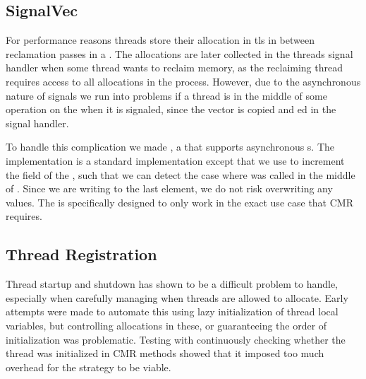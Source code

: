\subsection{SignalVec\label{sec:impl-signalvec}}

For performance reasons threads store their allocation in \gls{tls} in between reclamation passes
in a .  The allocations are later collected in the threads signal handler when some
thread wants to reclaim memory, as the reclaiming thread requires access to all allocations in the
process. However, due to the asynchronous nature of signals we run into problems if a thread is in
the middle of some operation on the  when it is signaled, since the vector is copied and
ed in the signal handler.

To handle this complication we made , a  that supports asynchronous
s. The implementation is a standard  implementation except that we use
 to increment the  field of the , such that we can detect
the case where  was called in the middle of . Since we are writing to the
last element, we do not risk overwriting any values. The  is specifically designed
to only work in the exact use case that CMR requires.


\subsection{Thread Registration\label{sec:impl-thread-registration}}

Thread startup and shutdown has shown to be a difficult problem to handle, especially when
carefully managing when threads are allowed to allocate. Early attempts were made to automate this
using lazy initialization of thread local variables, but controlling allocations in these, or
guaranteeing the order of initialization was problematic. Testing with continuously checking whether
the thread was initialized in CMR methods showed that it imposed too much overhead for the strategy
to be viable.
